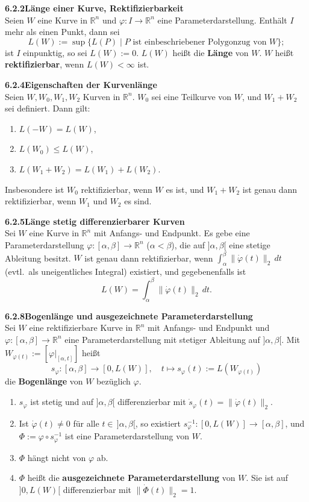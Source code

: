 \documentclass[a4paper,12pt]{article}
\newcommand{\gentry}[3]{%
  \noindent\textbf{#1\quad #2}\nopagebreak\\[0.2em]
  #3\par\smallskip
}
\begin{document}
\gentry{6.2.2}{Länge einer Kurve, Rektifizierbarkeit}{%
  Seien $W$ eine Kurve in $\mathbb{R}^n$ und $\varphi : I \longrightarrow \mathbb{R}^n$ eine
  Parameterdarstellung. Enthält $I$ mehr als einen Punkt, dann sei
  \[
    L(W) := \sup \{L(P) \mid P \text{ ist einbeschriebener Polygonzug von } W\};
  \]
  ist $I$ einpunktig, so sei $L(W) := 0$. $L(W)$ heißt die \textbf{Länge} von $W$.
  $W$ heißt \textbf{rektifizierbar}, wenn $L(W) < \infty$ ist.
}

\gentry{6.2.4}{Eigenschaften der Kurvenlänge}{%
  Seien $W, W_0, W_1, W_2$ Kurven in $\mathbb{R}^n$. $W_0$ sei eine Teilkurve von $W$,
  und $W_1 + W_2$ sei definiert. Dann gilt:
  \begin{enumerate}[label=(\roman*),topsep=2pt,itemsep=1pt]
    \item $L(-W) = L(W)$,
    \item $L(W_0) \leq L(W)$,
    \item $L(W_1 + W_2) = L(W_1) + L(W_2)$.
  \end{enumerate}
  Insbesondere ist $W_0$ rektifizierbar, wenn $W$ es ist, und $W_1 + W_2$ ist genau dann
  rektifizierbar, wenn $W_1$ und $W_2$ es sind.
}

\gentry{6.2.5}{Länge stetig differenzierbarer Kurven}{%
  Sei $W$ eine Kurve in $\mathbb{R}^n$ mit Anfangs- und Endpunkt. Es gebe eine
  Parameterdarstellung $\varphi : [\alpha, \beta] \longrightarrow \mathbb{R}^n$
  ($\alpha < \beta$), die auf $]\alpha, \beta[$ eine stetige Ableitung besitzt.
  $W$ ist genau dann rektifizierbar, wenn $\int_\alpha^\beta \|\dot{\varphi}(t)\|_2\,dt$
  (evtl.\ als uneigentliches Integral) existiert, und gegebenenfalls ist
  \[
    L(W) = \int_\alpha^\beta \|\dot{\varphi}(t)\|_2\, dt.
  \]
}

\gentry{6.2.8}{Bogenlänge und ausgezeichnete Parameterdarstellung}{%
  Sei $W$ eine rektifizierbare Kurve in $\mathbb{R}^n$ mit Anfangs- und Endpunkt und
  $\varphi : [\alpha, \beta] \longrightarrow \mathbb{R}^n$ eine Parameterdarstellung
  mit stetiger Ableitung auf $]\alpha, \beta[$. Mit $W_{\varphi(t)} := [\varphi|_{[\alpha,t]}]$
  heißt
  \[
    s_\varphi : [\alpha, \beta] \longrightarrow [0, L(W)], \quad
    t \mapsto s_\varphi(t) := L(W_{\varphi(t)})
  \]
  die \textbf{Bogenlänge} von $W$ bezüglich $\varphi$.
  \begin{enumerate}[label=(\roman*),topsep=2pt,itemsep=1pt]
    \item $s_\varphi$ ist stetig und auf $]\alpha, \beta[$ differenzierbar mit
          $\dot{s}_\varphi(t) = \|\dot{\varphi}(t)\|_2$.
    \item Ist $\dot{\varphi}(t) \neq 0$ für alle $t \in\, ]\alpha, \beta[$, so existiert
          $s_\varphi^{-1} : [0, L(W)] \longrightarrow [\alpha, \beta]$, und
          $\Phi := \varphi \circ s_\varphi^{-1}$ ist eine Parameterdarstellung von $W$.
    \item $\Phi$ hängt nicht von $\varphi$ ab.
    \item $\Phi$ heißt die \textbf{ausgezeichnete Parameterdarstellung} von $W$. Sie ist
          auf $]0, L(W)[$ differenzierbar mit $\|\dot{\Phi}(t)\|_2 = 1$.
  \end{enumerate}
}
\end{document}
